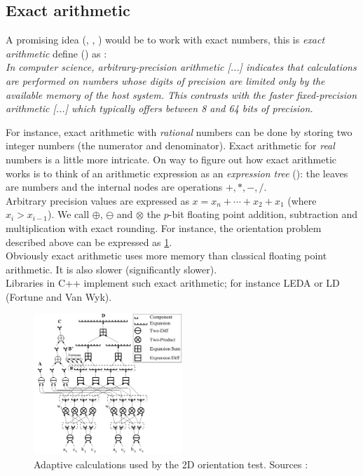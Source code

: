 \subsection{Exact arithmetic}
A promising idea (\cite{bronnimann2000efficient}, \cite{schirra}, \cite{shewchuk1996robust}) would be to work with exact numbers, this is \textit{exact arithmetic} define (\cite{exactArithmetic}) as : \\
\textit{In computer science, arbitrary-precision arithmetic [...] indicates that calculations are performed on numbers whose digits of precision are limited only by the available memory of the host system. This contrasts with the faster fixed-precision arithmetic [...] which typically offers between 8 and 64 bits of precision.}


For instance, exact arithmetic with \textit{rational} numbers can be done by storing two integer numbers (the numerator and denominator). Exact arithmetic for \textit{real} numbers is a little more intricate. 
On way to figure out how exact arithmetic works is to think of an arithmetic expression as an \textit{expression tree} (\cite{schirra}): the leaves are numbers and the internal nodes are operations $+,*,-,/$. \\
Arbitrary precision values are expressed as $x=x_n + \cdots + x_2 + x_1$ (where $x_i > x_{i-1}$). We call $\oplus$, $\ominus$ and $\otimes$ the $p$-bit floating point addition, subtraction and multiplication with exact rounding.
For instance, the orientation problem described above can be expressed as \ref{fig:ExactArithmetic}.\\

Obviously exact arithmetic uses more memory than classical floating point arithmetic. It is also slower (significantly slower).\\

Libraries in C++ implement such exact arithmetic; for instance LEDA or LD (Fortune and Van Wyk).

\begin{figure}
  \centering
  \includegraphics[width=0.5\textwidth]{images/orientation2d.png}
  \caption{Adaptive calculations used by the 2D orientation test. Sources : \cite{shewchuk1996robust}}
  \label{fig:ExactArithmetic}
\end{figure}

